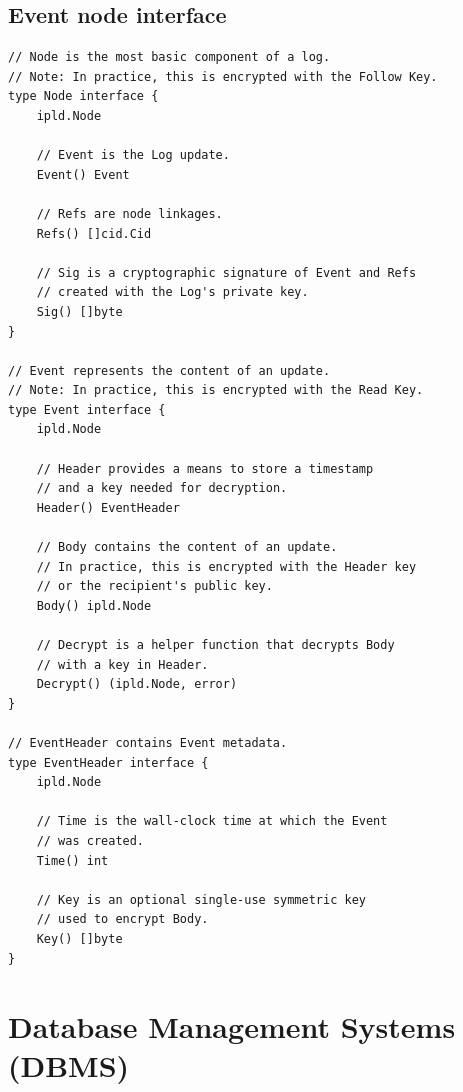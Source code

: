 \documentclass{textile}
\begin{document}
\appendix 
\begin{example*}[!p]
\section{Event node interface} \label{appx:EventNode} %
\begin{lstlisting}
// Node is the most basic component of a log.
// Note: In practice, this is encrypted with the Follow Key.
type Node interface {
    ipld.Node

    // Event is the Log update.
    Event() Event

    // Refs are node linkages.
    Refs() []cid.Cid

    // Sig is a cryptographic signature of Event and Refs
    // created with the Log's private key.
    Sig() []byte
}

// Event represents the content of an update.
// Note: In practice, this is encrypted with the Read Key.
type Event interface {
    ipld.Node

    // Header provides a means to store a timestamp
    // and a key needed for decryption.
    Header() EventHeader

    // Body contains the content of an update.
    // In practice, this is encrypted with the Header key
    // or the recipient's public key.
    Body() ipld.Node

    // Decrypt is a helper function that decrypts Body
    // with a key in Header.
    Decrypt() (ipld.Node, error)
}

// EventHeader contains Event metadata.
type EventHeader interface {
    ipld.Node

    // Time is the wall-clock time at which the Event
    // was created.
    Time() int

    // Key is an optional single-use symmetric key
    // used to encrypt Body.
    Key() []byte
}
\end{lstlisting} 
\end{example*} 

\onecolumn
\section{Database Management Systems (DBMS)} \label{appx:DBMS} 
\end{document}

